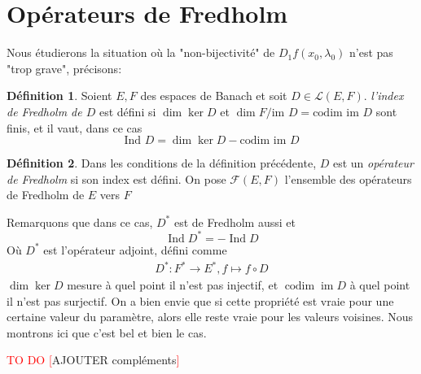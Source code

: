 \documentclass[a4paper,12pt,oneside,titlepage]{article}
\newcommand{\todo}[1]{\textcolor{red}{TO DO [}#1\textcolor{red}{]}}
\theoremstyle{definition}
\newtheorem{definition}{Définition}[section]
\theoremstyle{plain}
\begin{document}
\section{Opérateurs de Fredholm}

Nous étudierons la situation où la "non-bijectivité" de $D_{1}f(x_0,\lambda_0)$ n'est pas "trop grave", précisons:
\begin{definition}
    Soient $E,F$ des espaces de Banach et soit $D\in  \mathcal{L}(E,F)$. \textit{l'index de  Fredholm de $D$} est défini si $\dim \ker D$ et $\dim  F / \text{im } D=\text{codim } \text{im }D$ sont finis, et il vaut, dans ce cas
    \begin{equation*}
        \text{Ind }  D= \dim \ker D -\text{codim } \text{im }D
    \end{equation*}

\end{definition}

\begin{definition}
    Dans les conditions de la définition précédente, $D$ est un \textit{opérateur de Fredholm} si son index est défini. On pose $\mathcal{F}(E,F)$ l'ensemble des opérateurs de Fredholm de $E$ vers $F$
\end{definition}
Remarquons que dans ce cas, $D^*$ est de Fredholm aussi et 
\begin{equation}\label{adjointfred}
    \operatorname*{Ind} D^*=- \operatorname*{Ind} D
\end{equation}
Où $D^{*}$ est l'opérateur adjoint, défini comme
\begin{eqnarray*}
    D^{*}: F^{*}\rightarrow E^{*}, f\mapsto  f\circ D
\end{eqnarray*}
$\dim\ker D$ mesure à quel point il 
n'est pas injectif, et $
\operatorname{codim} 
\operatorname{im} D$ à quel point 
il n'est pas surjectif. On a bien envie que si cette propriété est vraie pour une certaine valeur du paramètre, alors elle reste vraie pour les valeurs voisines. Nous montrons ici que c'est bel et bien le cas.

\todo{AJOUTER compléments}\\
\end{document}

